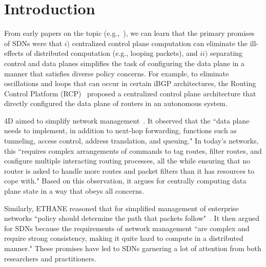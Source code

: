 \section{Introduction}
\label{sec:intro}

From early papers on the topic (e.g.,~\cite{rcp-case,rcp,4d,ethane}), we can learn that the primary promises of SDNs were that $i)$  centralized control plane computation can eliminate the ill-effects of distributed computation (e.g., looping packets), and $ii)$ separating control and data planes simplifies the task of configuring the data plane in a manner that satisfies diverse policy concerns.
For example, to eliminate oscillations and loops that can occur in certain iBGP architectures, the Routing Control Platform (RCP)~\cite{rcp-case,rcp} proposed a centralized control plane architecture that directly configured the data plane of routers in an autonomous system.

4D aimed to simplify network management~\cite{4d}. It observed that the ``data plane needs to implement, in addition to next-hop forwarding, functions such as tunneling, access control, address translation, and queuing." In today's networks, this ``requires complex arrangements of commands to tag routes, filter routes, and configure multiple interacting routing processes, all the while ensuring that no router is asked to handle more routes and packet filters than it has resources to cope with."
Based on this observation, it argues for centrally computing data plane state in a way that obeys all concerns.

Similarly, ETHANE reasoned that for simplified management of enterprise networks ``policy should determine the path that packets follow"~\cite{ethane}. It then argued for SDNs because the requirements of network management ``are complex and require strong consistency, making it quite hard to compute in a distributed manner." These promises have led to SDNs garnering a lot of attention from both researchers and practitioners.


